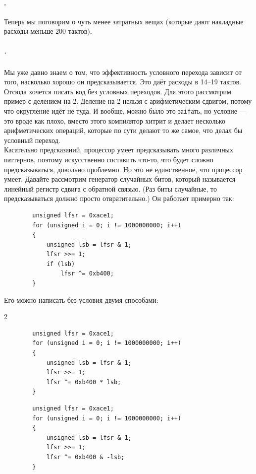 \documentclass{article}
\begin{document}
    \paragraph{.}
    Теперь мы поговорим о чуть менее затратных вещах (которые дают накладные расходы меньше 200 тактов).
    \subparagraph{.}
    Мы уже давно знаем о том, что эффективность условного перехода зависит от того, насколько хорошо он предсказывается. Это даёт расходы в 14--19 тактов. Отсюда хочется писать код без условных переходов. Для этого рассмотрим пример с делением на 2. Деление на 2 нельзя с арифметическим сдвигом, потому что округление идёт не туда. И вообще, можно было это за\texttt{if}ать, но условие --- это вроде как плохо, вместо этого компилятор хитрит и делает несколько арифметических операций, которые по сути делают то же самое, что делал бы условный переход.\\
    Касательно предсказаний, процессор умеет предсказывать много различных паттернов, поэтому искусственно составить что-то, что будет сложно предсказываться, довольно проблемно. Но это не единственное, что процессор умеет. Давайте рассмотрим генератор случайных битов, который называется линейный регистр сдвига с обратной связью. (Раз биты случайные, то предсказываться должно просто отвратительно.) Он работает примерно так:
    \begin{verbatim}
        unsigned lfsr = 0xace1;
        for (unsigned i = 0; i != 1000000000; i++)
        {
            unsigned lsb = lfsr & 1;
            lfsr >>= 1;
            if (lsb)
                lfsr ^= 0xb400;
        }
    \end{verbatim}
    Его можно написать без условия двумя способами:
    \begin{multicols}{2}
    \begin{verbatim}
        unsigned lfsr = 0xace1;
        for (unsigned i = 0; i != 1000000000; i++)
        {
            unsigned lsb = lfsr & 1;
            lfsr >>= 1;
            lfsr ^= 0xb400 * lsb;
        }
    \end{verbatim}
    \columnbreak
    \begin{verbatim}
        unsigned lfsr = 0xace1;
        for (unsigned i = 0; i != 1000000000; i++)
        {
            unsigned lsb = lfsr & 1;
            lfsr >>= 1;
            lfsr ^= 0xb400 & -lsb;
        }
    \end{verbatim}
    \end{multicols}
\end{document}
